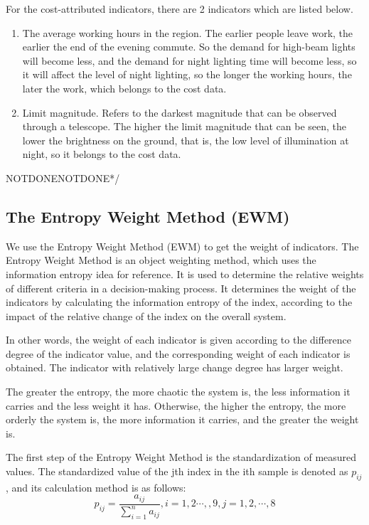 For the cost-attributed indicators, there are 2 indicators which are listed below.
\begin{enumerate}
    \item The average working hours in the region. The earlier people leave work, the earlier the end of the evening commute. So the demand for high-beam lights will become less, and the demand for night lighting time will become less, so it will affect the level of night lighting, so the longer the working hours, the later the work, which belongs to the cost data.
    
    \item Limit magnitude. Refers to the darkest magnitude that can be observed through a telescope. The higher the limit magnitude that can be seen, the lower the brightness on the ground, that is, the low level of illumination at night, so it belongs to the cost data.
\end{enumerate}




NOTDONENOTDONE*/

\subsection{The Entropy Weight Method (EWM) }
We use the Entropy Weight Method (EWM) to get the weight of indicators. The Entropy Weight Method is an object weighting method, which uses the information entropy idea for reference. It is used to determine the relative weights of different criteria in a decision-making process. It determines the weight of the indicators by calculating the information entropy of the index, according to the impact of the relative change of the index on the overall system.

In other words, the weight of each indicator is given according to the difference degree of the indicator value, and the corresponding weight of each indicator is obtained. The indicator with relatively large change degree has larger weight. 

The greater the entropy, the more chaotic the system is, the less information it carries and the less weight it has. Otherwise, the higher the entropy, the more orderly the system is, the more information it carries, and the greater the weight is.

The first step of the Entropy Weight Method is the standardization of measured values. The standardized value of the jth index in the ith sample is denoted as $p_{ij}$, and its calculation method is as follows:$$p_{ij}=\frac{a_{ij}}{\sum_{i=1}^na_{ij}},i=1,2\cdots,,9,j=1,2,\cdots,8$$

